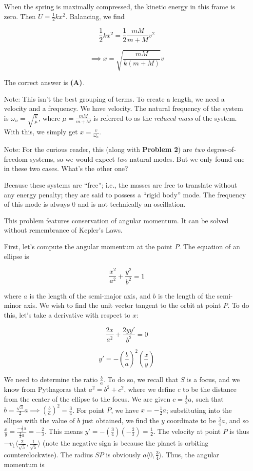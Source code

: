 \documentclass[12pt]{article}
\begin{document}
When the spring is maximally compressed, the kinetic energy in this frame is zero. Then $U = \frac{1}{2} k x^2$. Balancing, we find

$$\frac{1}{2} k x^2 = \frac{1}{2} \frac{m M}{m + M} v^2$$

$$\implies x = \sqrt{\frac{m M}{k (m + M)}} v$$

The correct answer is \textbf{(A)}.

Note: This isn't the best grouping of terms. To create a length, we need a velocity and a frequency. We have velocity. The natural frequency of the system is $\omega_n = \sqrt{\frac{k}{\mu}}$, where $\mu = \frac{m M}{m + M}$ is referred to as the \textit{reduced mass} of the system. With this, we simply get $x = \frac{v}{\omega_n}$.

Note: For the curious reader, this (along with \textbf{Problem 2}) are \textit{two} degree-of-freedom systems, so we would expect \textit{two} natural modes. But we only found one in these two cases. What's the other one?

Because these systems are ``free''; i.e., the masses are free to translate without any energy penalty; they are said to possess a ``rigid body'' mode. The frequency of this mode is always $0$ and is not technically an oscillation.


\vspace{2 \baselineskip}



This problem features conservation of angular momentum. It can be solved without remembrance of Kepler's Laws.

First, let's compute the angular momentum at the point $P$. The equation of an ellipse is

$$\frac{x^2}{a^2} + \frac{y^2}{b^2} = 1$$

where $a$ is the length of the semi-major axis, and $b$ is the length of the semi-minor axis. We wish to find the unit vector tangent to the orbit at point $P$. To do this, let's take a derivative with respect to $x$:

$$\frac{2 x}{a^2} + \frac{2 y y'}{b^2} = 0$$

$$y' = -\left( \frac{b}{a} \right)^2 \left( \frac{x}{y} \right)$$

We need to determine the ratio $\frac{b}{a}$. To do so, we recall that $S$ is a focus, and we know from Pythagoras that $a^2 = b^2 + c^2$, where we define $c$ to be the distance from the center of the ellipse to the focus. We are given $c = \frac{1}{2} a$, such that $b = \frac{\sqrt{3}}{2} a \implies \left( \frac{b}{a} \right)^2 = \frac{3}{4}$. For point $P$, we have $x = -\frac{1}{2} a$; substituting into the ellipse with the value of $b$ just obtained, we find the $y$ coordinate to be $\frac{3}{4} a$, and so $\frac{x}{y} = \frac{-\frac{1}{2} a}{\frac{3}{4} a} = -\frac{2}{3}$. This means $y' = -\left( \frac{3}{4} \right) \left( -\frac{2}{3} \right) = \frac{1}{2}$. The velocity at point $P$ is thus $-v_1 \langle \frac{2}{\sqrt{5}}, \frac{1}{\sqrt{5}} \rangle$ (note the negative sign is because the planet is orbiting counterclockwise). The radius $SP$ is obviously $a \langle 0, \frac{3}{4} \rangle$. Thus, the angular momentum is
\end{document}
